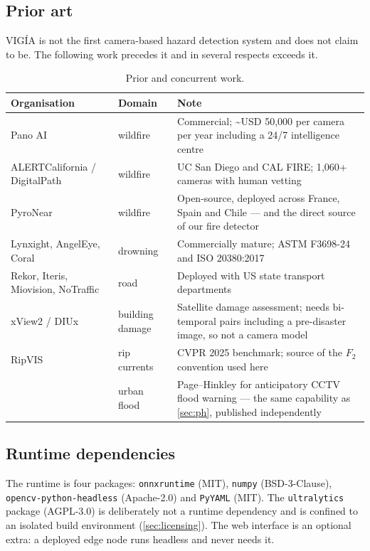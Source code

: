 \subsection{Prior art}

VIGÍA is not the first camera-based hazard detection system and does not claim
to be. The following work precedes it and in several respects exceeds it.

\begin{table}[htbp]
\centering\small
\caption{Prior and concurrent work.}
\label{tab:priorart}
\begin{tabularx}{\textwidth}{l l L}
\toprule
Organisation & Domain & Note \\
\midrule
Pano AI & wildfire & Commercial; \textasciitilde USD 50{,}000 per camera per year including a 24/7 intelligence centre \\
ALERTCalifornia / DigitalPath & wildfire & UC San Diego and CAL FIRE; 1{,}060+ cameras with human vetting \\
PyroNear & wildfire & Open-source, deployed across France, Spain and Chile — and the direct source of our fire detector \\
Lynxight, AngelEye, Coral & drowning & Commercially mature; ASTM F3698-24 and ISO 20380:2017 \\
Rekor, Iteris, Miovision, NoTraffic & road & Deployed with US state transport departments \\
xView2 / DIUx~\citep{gupta2019xbd} & building damage & Satellite damage assessment; needs bi-temporal pairs including a pre-disaster image, so not a camera model \\
RipVIS~\citep{ripvis2025} & rip currents & CVPR 2025 benchmark; source of the $F_2$ convention used here \\
\citet{choi2026pagehinkley} & urban flood & Page--Hinkley for anticipatory CCTV flood warning — the same capability as \cref{sec:ph}, published independently \\
\bottomrule
\end{tabularx}
\end{table}

\subsection{Runtime dependencies}

The runtime is four packages: \texttt{onnxruntime} (MIT), \texttt{numpy}
(BSD-3-Clause), \texttt{opencv-python-headless} (Apache-2.0) and
\texttt{PyYAML} (MIT). The \texttt{ultralytics} package (AGPL-3.0) is
deliberately not a runtime dependency and is confined to an isolated build
environment (\cref{sec:licensing}). The web interface is an optional extra: a
deployed edge node runs headless and never needs it.

